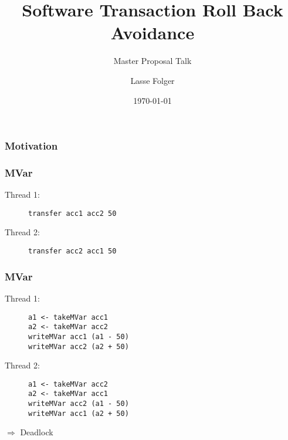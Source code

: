 \documentclass{beamer}
\author{Lasse Folger}
\title{\huge Software Transaction Roll Back Avoidance}
\subtitle{Master Proposal Talk}
\date{\today}
\begin{document}
  \begin{frame}[t,plain]
    \titlepage
  \end{frame}
  
  
  \begin{frame}[plain]
    \frametitle{Motivation}
    
  \end{frame}
  
  \begin{frame}[fragile]
    \frametitle{MVar}
    \fboxsep=0pt
    \noindent
    \begin{minipage}[t]{0.48\linewidth}
      Thread 1:
            \begin{figure}
       \begin{lstlisting}[frame=single]
transfer acc1 acc2 50
       \end{lstlisting}
      \end{figure}
\end{minipage}%
    \hfill%
    \begin{minipage}[t]{0.48\linewidth}
      Thread 2:      
      \begin{figure}
       \begin{lstlisting}[frame=single]
transfer acc2 acc1 50
       \end{lstlisting}
      \end{figure}
    \end{minipage}
\end{frame}

  \begin{frame}[fragile]
    \frametitle{MVar}
    \fboxsep=0pt
    \noindent
    \begin{minipage}[t]{0.48\linewidth}
      Thread 1:
            \begin{figure}
       \begin{lstlisting}[frame=single]
a1 <- takeMVar acc1 
a2 <- takeMVar acc2 
writeMVar acc1 (a1 - 50)
writeMVar acc2 (a2 + 50)
       \end{lstlisting}
      \end{figure}
\end{minipage}%
    \hfill%
    \begin{minipage}[t]{0.48\linewidth}
      Thread 2:      
      \begin{figure}
       \begin{lstlisting}[frame=single]
a1 <- takeMVar acc2 
a2 <- takeMVar acc1 
writeMVar acc2 (a1 - 50)
writeMVar acc1 (a2 + 50)
       \end{lstlisting}
      \end{figure}
    \end{minipage}
    \vfill
    \pause
    $\Rightarrow$ Deadlock
\end{frame}
  
\end{document}
